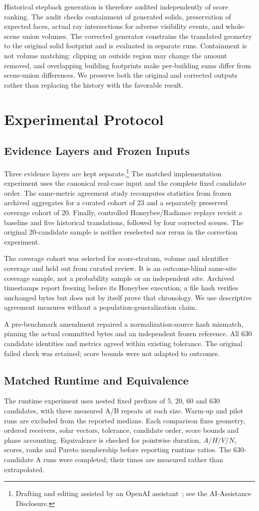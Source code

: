 \documentclass{llncs}
\newcommand{\aidraft}{\footnote{Drafting and editing assisted by an OpenAI assistant~\cite{openai2026}; see the AI-Assistance Disclosure.}}
\begin{document}
Historical stepback generation is therefore audited independently of score ranking. The audit checks containment of generated solids, preservation of expected faces, actual ray intersections for adverse visibility events, and whole-scene union volumes. The corrected generator constrains the translated geometry to the original solid footprint and is evaluated in separate runs. Containment is not volume matching: clipping an outside region may change the amount removed, and overlapping building footprints make per-building sums differ from scene-union differences. We preserve both the original and corrected outputs rather than replacing the history with the favorable result.

\section{Experimental Protocol}
\subsection{Evidence Layers and Frozen Inputs}
Three evidence layers are kept separate.\aidraft{} The matched implementation experiment uses the canonical real-case input and the complete fixed candidate order. The same-metric agreement study recomputes statistics from frozen archived aggregates for a curated cohort of 23 and a separately preserved coverage cohort of 20. Finally, controlled Honeybee/Radiance replays revisit a baseline and five historical translations, followed by four corrected scenes. The original 20-candidate sample is neither reselected nor rerun in the correction experiment.

The coverage cohort was selected for score-stratum, volume and identifier coverage and held out from curated review. It is an outcome-blind same-site coverage sample, not a probability sample or an independent site. Archived timestamps report freezing before its Honeybee execution; a file hash verifies unchanged bytes but does not by itself prove that chronology. We use descriptive agreement measures without a population-generalization claim.

A pre-benchmark amendment repaired a normalization-source hash mismatch, pinning the actual committed bytes and an independent frozen reference. All 630 candidate identities and metrics agreed within existing tolerance. The original failed check was retained; score bounds were not adapted to outcomes.

\subsection{Matched Runtime and Equivalence}
The runtime experiment uses nested fixed prefixes of 5, 20, 60 and 630 candidates, with three measured A/B repeats at each size. Warm-up and pilot runs are excluded from the reported medians. Each comparison fixes geometry, ordered receivers, solar vectors, tolerance, candidate order, score bounds and phase accounting. Equivalence is checked for pointwise duration, $A/H/V/N$, scores, ranks and Pareto membership before reporting runtime ratios. The 630-candidate A runs were completed; their times are measured rather than extrapolated.
\end{document}
